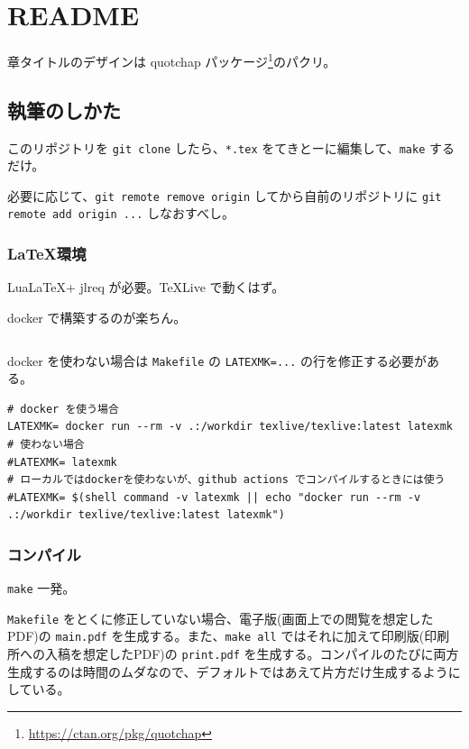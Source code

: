 \chapter{README}

章タイトルのデザインは quotchap パッケージ\footnote{\url{https://ctan.org/pkg/quotchap}}のパクリ。

\section{執筆のしかた}

このリポジトリを \verb`git clone` したら、\verb`*.tex` をてきとーに編集して、\verb`make` するだけ。

必要に応じて、\verb`git remote remove origin` してから自前のリポジトリに \verb`git remote add origin ...` しなおすべし。

\subsection{\LaTeX 環境}

Lua\LaTeX + jlreq が必要。\TeX Live で動くはず。

docker で構築するのが楽ちん。

\begin{lstlisting}[style=simple]
% docker pull texlive/texlive:latest
\end{lstlisting}

docker を使わない場合は \verb`Makefile` の \verb`LATEXMK=...` の行を修正する必要がある。

\begin{lstlisting}
# docker を使う場合
LATEXMK= docker run --rm -v .:/workdir texlive/texlive:latest latexmk
# 使わない場合
#LATEXMK= latexmk
# ローカルではdockerを使わないが、github actions でコンパイルするときには使う
#LATEXMK= $(shell command -v latexmk || echo "docker run --rm -v .:/workdir texlive/texlive:latest latexmk")
\end{lstlisting}

\subsection{コンパイル}

\verb`make` 一発。

\verb`Makefile` をとくに修正していない場合、電子版(画面上での閲覧を想定したPDF)の \verb`main.pdf` を生成する。また、\verb`make all` ではそれに加えて印刷版(印刷所への入稿を想定したPDF)の \verb`print.pdf` を生成する。コンパイルのたびに両方生成するのは時間のムダなので、デフォルトではあえて片方だけ生成するようにしている。

